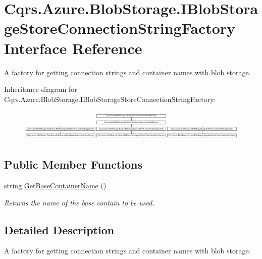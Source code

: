 \hypertarget{interfaceCqrs_1_1Azure_1_1BlobStorage_1_1IBlobStorageStoreConnectionStringFactory}{}\section{Cqrs.\+Azure.\+Blob\+Storage.\+I\+Blob\+Storage\+Store\+Connection\+String\+Factory Interface Reference}
\label{interfaceCqrs_1_1Azure_1_1BlobStorage_1_1IBlobStorageStoreConnectionStringFactory}


A factory for getting connection strings and container names with blob storage.  


Inheritance diagram for Cqrs.\+Azure.\+Blob\+Storage.\+I\+Blob\+Storage\+Store\+Connection\+String\+Factory\+:\begin{figure}[H]
\begin{center}
\leavevmode
\includegraphics[height=1.505376cm]{interfaceCqrs_1_1Azure_1_1BlobStorage_1_1IBlobStorageStoreConnectionStringFactory}
\end{center}
\end{figure}
\subsection*{Public Member Functions}
\begin{DoxyCompactItemize}
\item 
string \hyperlink{interfaceCqrs_1_1Azure_1_1BlobStorage_1_1IBlobStorageStoreConnectionStringFactory_a57145e68e3bda84bc610fa61226a850c_a57145e68e3bda84bc610fa61226a850c}{Get\+Base\+Container\+Name} ()
\begin{DoxyCompactList}\small\item\em Returns the name of the base contain to be used. \end{DoxyCompactList}\end{DoxyCompactItemize}


\subsection{Detailed Description}
A factory for getting connection strings and container names with blob storage. 



